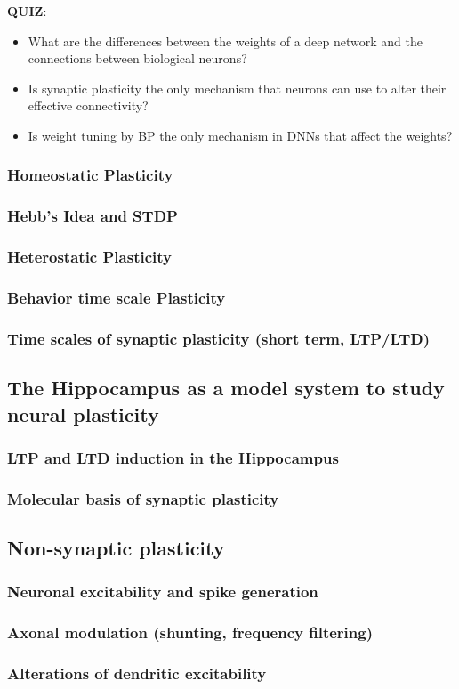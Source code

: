 \documentclass[main]{subfiles}
\begin{document}
\textbf{QUIZ}:
\begin{itemize}
    \item What are the diﬀerences between the weights of a deep network and the connections between biological neurons?
    \item Is synaptic plasticity the only mechanism that neurons can use to alter their eﬀective connectivity?
    \item Is weight tuning by BP the only mechanism in DNNs that aﬀect the weights?
\end{itemize}

\subsubsection{Homeostatic Plasticity}
\subsubsection{Hebb’s Idea and STDP}
\subsubsection{Heterostatic Plasticity}
\subsubsection{Behavior time scale Plasticity}
\subsubsection{Time scales of synaptic plasticity (short term, LTP/LTD)}

\subsection{The Hippocampus as a model system to study neural plasticity}
\subsubsection{LTP and LTD induction in the Hippocampus}
\subsubsection{Molecular basis of synaptic plasticity}

\subsection{Non-synaptic plasticity}
\subsubsection{Neuronal excitability and spike generation}
\subsubsection{Axonal modulation (shunting, frequency filtering)}
\subsubsection{Alterations of dendritic excitability}
\end{document}
